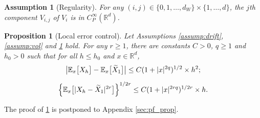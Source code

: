 \documentclass[11pt]{article}
\newtheorem{assumption}{Assumption}
\newtheorem{proposition}{Proposition}
\begin{document}
\begin{assumption}[Regularity] \label{assump:deriv_poly}
For any $(i, j) \in  \{0, 1, \ldots, d_W \} \times \{1, \ldots, d\}$, the $j$th component $V_{i, j}$ of $V_i$ is in $C_P^\infty (\mathbb{R}^d)$. 
% 
\end{assumption} 

\begin{proposition}[Local error control] \label{prop:one_step_s}
Let Assumptions \ref{assump:drift}, \ref{assump:vol} and \ref{assump:deriv_poly} hold. For any $r \ge 1$, there are constants $C > 0$, $q \ge 1$ and $h_0 > 0$ such that for all $h \le  h_0$ and $x \in \mathbb{R}^d$, 
% 
\begin{gather}
\bigl|\mathbb{E}_x  \bigl[ X_h \bigr] - \mathbb{E}_x  \bigl[ \widetilde{X}_1  \bigr]  \bigr| 
\le C ( 1 + |x|^{2q} )^{1/2} \times h^2;  \label{eq:local_mean} \\[0.2cm]
\Bigl\{  \mathbb{E}_x \bigl[ | X_h - \widetilde{X}_1|^{2r}  \bigr] 
\Bigr\}^{{1}/{2r}} 
\le  
C(  1 +  | x |^{2 rq}  )^{{1}/{2r}}  \times h. \label{eq:local_Lp}
\end{gather}
%   
\end{proposition}

The proof of \cref{prop:one_step_s} is postponed to Appendix \ref{sec:pf_prop}. 
\\ 
\end{document}
